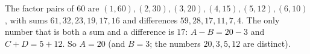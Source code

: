 The factor pairs of $60$ are $(1,60),(2,30),(3,20),(4,15),(5,12),(6,10)$, with sums $61,32,23,19,17,16$ and differences $59,28,17,11,7,4$. The only number that is both a sum and a difference is $17$: $A-B=20-3$ and $C+D=5+12$. So $A=\boxed{20}$ (and $B=3$; the numbers $20,3,5,12$ are distinct).
